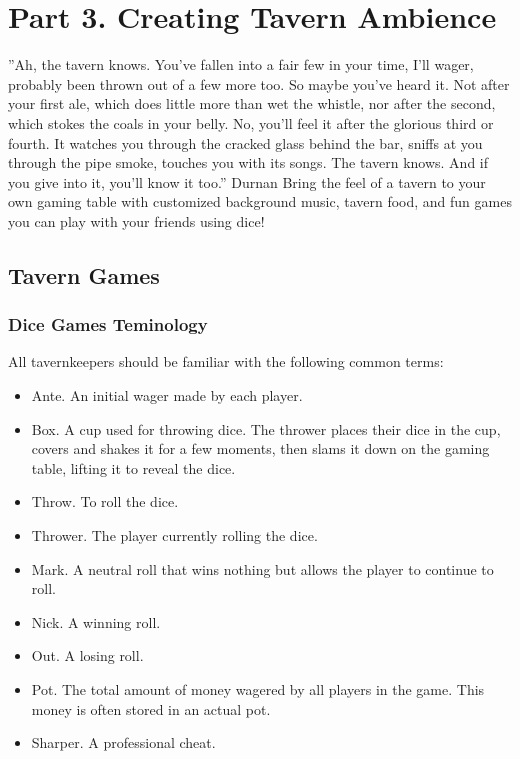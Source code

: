 \documentclass[10pt,a4paper,twoside,twocolumn,openany,bg=print,nodeprecatedcode]{dndbook}
\begin{document}
\chapter{Part 3. Creating Tavern Ambience}
\DndQuote%
{}
{''Ah, the tavern knows. You've fallen into a fair few in your time, I'll wager, probably been thrown out of a few more too. So maybe you've heard it. Not after your first ale, which does little more than wet the whistle, nor after the second, which stokes the coals in your belly. No, you'll feel it after the glorious third or fourth. It watches you through the cracked glass behind the bar, sniffs at you through the pipe smoke, touches you with its songs. The tavern knows. And if you give into it, you'll know it too.''}
{Durnan}
Bring the feel of a tavern to your own gaming table with customized background music, tavern food, and fun games you can play with your friends using dice!
\section{Tavern Games}
\subsection{Dice Games Teminology}
All tavernkeepers should be familiar with the following common terms:

\begin{itemize}
\item Ante. An initial wager made by each player.
\item Box. A cup used for throwing dice. The thrower places their dice in the cup, covers and shakes it for a few moments, then slams it down on the gaming table, lifting it to reveal the dice.
\item Throw. To roll the dice.
\item Thrower. The player currently rolling the dice.
\item Mark. A neutral roll that wins nothing but allows the player to continue to roll.
\item Nick. A winning roll.
\item Out. A losing roll.
\item Pot. The total amount of money wagered by all players in the game. This money is often stored in an actual pot.
\item Sharper. A professional cheat.
\end{itemize}
\end{document}

